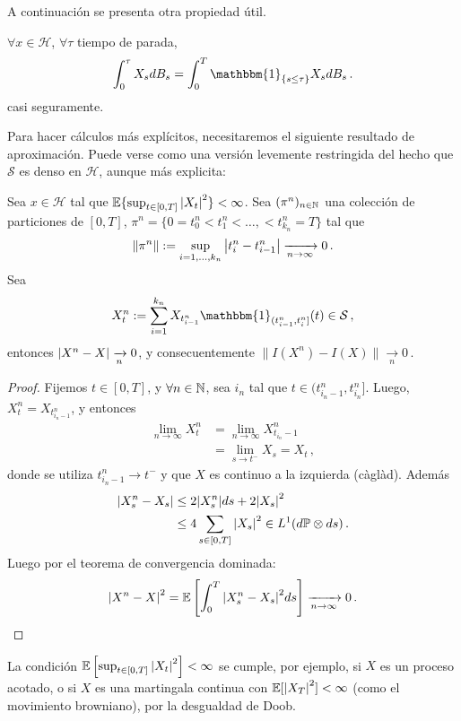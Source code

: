 A continuación se presenta otra propiedad útil.
\begin{proposition}
$\forall  x \in \mathcal{H}$, $\forall \tau$ tiempo de parada,
\begin{equation*}
    \int_{0}^{\tau} X_s dB_s = \int_{0}^{T} \mathbbm{1}_{\{s \le \tau \}} X_s dB_s\,.
\end{equation*}
casi seguramente.
\end{proposition}

Para hacer cálculos más explícitos, necesitaremos el siguiente resultado de aproximación. Puede verse como una versión levemente restringida del hecho que $\mathcal{S}$ es denso en $\mathcal{H}$, aunque más explicita: 
\begin{proposition}
Sea $x \in \mathcal{H}$ tal que $\mathbb{E}\{ \sup_{t \in [0,T]} \abs{X_t}^2 \} < \infty$. Sea $(\pi^n)_{n \in \mathbb{N}}$ una colección de particiones de $[0,T]$, $\pi^{n} = \{ 0= t_0^{n}< t_{1}^n< \ldots, < t_{k_n}^{n} = T\}$ tal que 
\begin{equation*}
    \|\pi^n\| := \sup_{i = 1, \ldots, k_n} \abs{t_i^n - t_{i-1}^{n}} \xrightarrow[n \to \infty]{} 0 \,.
\end{equation*}
Sea
\begin{equation*}
    X_t^n := \sum_{i=1}^{k_n} X_{t_{i-1}^n} \mathbbm{1}_{(t_{i-1}^n, t_{i}^{n}]}(t) \in \mathcal{S}\,,
\end{equation*}
entonces $\abs{X^n - X} \xrightarrow[n]{} 0$, y consecuentemente $\|I(X^n) - I(X)\| \xrightarrow[n]{} 0$\,.
\end{proposition}
\begin{proof}
\gris
Fijemos $t \in [0,T]$, y $\forall n \in \mathbb{N}$, sea $i_n$ tal que $t \in (t_{i_n -1}^n, t_{i_n}^n]$. 
Luego, $X_{t}^{n} = X_{t_{i_n -1}^n}$, y entonces 
\begin{align*}
        \lim_{n \to \infty} X_{t}^{n} 
        &= \lim_{n \to \infty} X_{t_{i_n} - 1}^n \\
        &= \lim_{s \to t^{-}} X_s = X_t \,,
\end{align*}
donde se utiliza $t_{i_n - 1}^n \to t^{-}$ y que $X$ es continuo a la izquierda (càglàd). Además 
\begin{align*}
        \abs{X^n_s - X_s} 
        &\le 2 \abs{X_{s}^n} ds + 2 \abs{X_s}^2\\
        &\le 4 \sum_{s \in [0,T]} \abs{X_s}^2 \in L^{1}(d\mathbb{P} \otimes ds) \,.
\end{align*}
Luego por el teorema de convergencia dominada:
\begin{equation*}
    \abs{X^n - X}^2 = \mathbb{E}\left[ \int_{0}^{T} \abs{X_s^n - X_s}^2 ds \right] \xrightarrow[n \to \infty]{}  0\,.
\end{equation*}
\findem
\negro
\end{proof}
\begin{remark}
La condición $\mathbb{E} \left[ \sup_{t \in [0,T]} \abs{X_t}^2 \right] < \infty$ se cumple, por ejemplo, si $X$ es un proceso acotado, o si $X$ es una martingala continua con $\mathbb{E} [\abs{X_T}^2] < \infty$ (como el movimiento browniano), por la desgualdad de Doob.
\end{remark}

